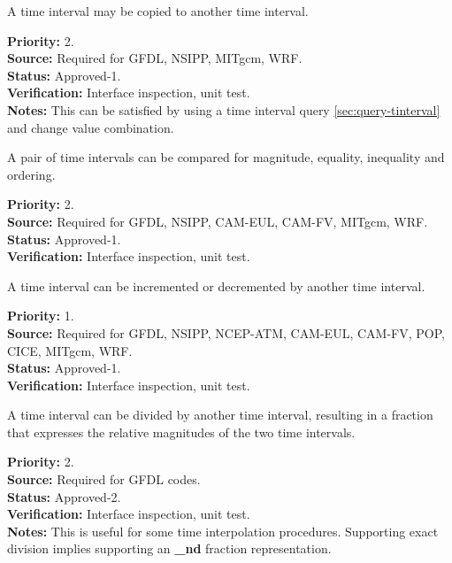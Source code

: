 A time interval may be copied to another time interval. 
\begin{reqlist}
{\bf Priority:} 2. \\
{\bf Source:} Required for GFDL, NSIPP, MITgcm, WRF. \\
{\bf Status:} Approved-1. \\
{\bf Verification:} Interface inspection, unit test. \\ 
{\bf Notes:}  This can be satisfied by using a time interval 
query \ref{sec:query-tinterval} and change value combination.
\end{reqlist}

A pair of time intervals can be compared for magnitude, equality, inequality
 and ordering.
\begin{reqlist}
{\bf Priority:} 2. \\
{\bf Source:} Required for GFDL, NSIPP, CAM-EUL, CAM-FV, MITgcm, WRF.\\
{\bf Status:} Approved-1. \\
{\bf Verification:} Interface inspection, unit test. 
\end{reqlist}

A time interval can be incremented or decremented by another time interval.
\begin{reqlist}
{\bf Priority:} 1. \\
{\bf Source:} Required for GFDL, NSIPP, NCEP-ATM, CAM-EUL, CAM-FV, POP, CICE, MITgcm, WRF. \\
{\bf Status:} Approved-1. \\
{\bf Verification:} Interface inspection, unit test. 
\end{reqlist}

A time interval can be divided by another time interval, resulting in a
fraction that expresses the relative magnitudes of the two time intervals.
\begin{reqlist}
{\bf Priority:} 2. \\
{\bf Source:} Required for GFDL codes. \\
{\bf Status:} Approved-2. \\
{\bf Verification:} Interface inspection, unit test. \\
{\bf Notes:} This is useful for some time interpolation procedures.
Supporting exact division implies supporting an {\bf\_{nd}} fraction representation.
\end{reqlist}

